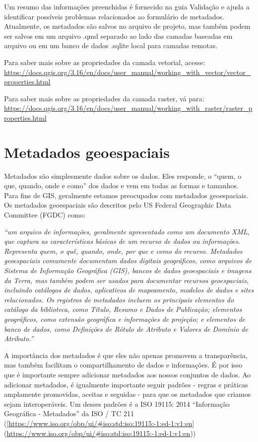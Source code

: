 \documentclass[
]{krantz}
\begin{document}
Um resumo das informações preenchidas é fornecido na guia Validação e ajuda a identificar possíveis problemas relacionados ao formulário de metadados. Atualmente, os metadados são salvos no arquivo de projeto, mas também podem ser salvos em um arquivo .qmd separado ao lado das camadas baseadas em arquivo ou em um banco de dados .sqlite local para camadas remotas.

Para saber mais sobre as propriedades da camada vetorial, acesse: \href{https://docs.qgis.org/3.16/en\%20/docs/user_manual/working_with_vector/vector_properties.html}{https://docs.qgis.org/3.16/en/docs/user\_manual/working\_with\_vector/vector\_properties.html}

Para saber mais sobre as propriedades da camada raster, vá para: \href{https:\%20//docs.qgis.org/3.16/en/docs/user_manual/working_with_raster/raster_properties.html}{https://docs.qgis.org/3.16/en/docs/user\_manual/working\_with\_raster/raster\_properties.html}

\hypertarget{metadados-geoespaciais}{%
\section{Metadados geoespaciais}\label{metadados-geoespaciais}}

Metadados são simplesmente dados sobre os dados. Eles responde, o ``quem, o que, quando, onde e como'' dos dados e vem em todas as formas e tamanhos. Para fins de GIS, geralmente estamos preocupados com metadados geoespaciais. Os metadados geoespaciais são descritos pelo US Federal Geographic Data Committee (FGDC) como:

\emph{``um arquivo de informações, geralmente apresentado como um documento XML, que captura as características básicas de um recurso de dados ou informações. Representa quem, o quê, quando, onde, por que e como do recurso. Metadados geoespaciais comumente documentam dados digitais geográficos, como arquivos de Sistema de Informação Geográfica (GIS), bancos de dados geoespaciais e imagens da Terra, mas também podem ser usados para documentar recursos geoespaciais, incluindo catálogos de dados, aplicativos de mapeamento, modelos de dados e sites relacionados. Os registros de metadados incluem os principais elementos do catálogo da biblioteca, como Título, Resumo e Dados de Publicação; elementos geográficos, como extensão geográfica e informações de projeção; e elementos de banco de dados, como Definições de Rótulo de Atributo e Valores de Domínio de Atributo.''}

A importância dos metadados é que eles não apenas promovem a transparência, mas também facilitam o compartilhamento de dados e informações. É por isso que é importante sempre adicionar metadados aos nossos conjuntos de dados. Ao adicionar metadados, é igualmente importante seguir padrões - regras e práticas amplamente promovidas, aceitas e seguidas - para que os metadados que criamos sejam interoperáveis. Um desses padrões é a ISO 19115: 2014 ``Informação Geográfica - Metadados'' da ISO / TC 211 ({[}\url{https://www.iso.org/obp/ui/\#iso:std:iso:19115:-1:ed-1:v1:en}{]} (\url{https://www.iso.org/obp/ui/\#iso:std:iso:19115:-1:ed-1:v1:en}))
\end{document}
